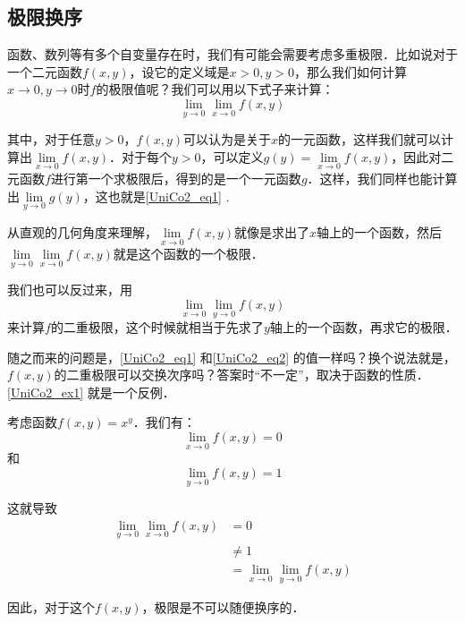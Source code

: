 

\subsection{极限换序}

函数、数列等有多个自变量存在时，我们有可能会需要考虑多重极限．比如说对于一个二元函数$f(x, y)$，设它的定义域是$x>0, y>0$，那么我们如何计算$x\to 0, y\to 0$时$f$的极限值呢？我们可以用以下式子来计算：
\begin{equation}\label{UniCo2_eq1}
\lim\limits_{y\to 0}\lim\limits_{x\to 0}f(x, y)
\end{equation}

其中，对于任意$y>0$，$f(x, y)$可以认为是关于$x$的一元函数，这样我们就可以计算出$\lim\limits_{x\to 0}f(x, y)$．对于每个$y>0$，可以定义$g(y)=\lim\limits_{x\to 0}f(x, y)$，因此对二元函数$f$进行第一个求极限后，得到的是一个一元函数$g$．这样，我们同样也能计算出$\lim\limits_{y\to 0}g(y)$，这也就是\autoref{UniCo2_eq1} .

从直观的几何角度来理解，$\lim\limits_{x\to 0}f(x, y)$就像是求出了$x$轴上的一个函数，然后$\lim\limits_{y\to 0}\lim\limits_{x\to 0}f(x, y)$就是这个函数的一个极限．

我们也可以反过来，用
\begin{equation}\label{UniCo2_eq2}
\lim\limits_{x\to 0}\lim\limits_{y\to 0}f(x, y)
\end{equation}
来计算$f$的二重极限，这个时候就相当于先求了$y$轴上的一个函数，再求它的极限．

随之而来的问题是，\autoref{UniCo2_eq1} 和\autoref{UniCo2_eq2} 的值一样吗？换个说法就是，$f(x, y)$的二重极限可以交换次序吗？答案时“不一定”，取决于函数的性质．\autoref{UniCo2_ex1} 就是一个反例．

\begin{example}{}\label{UniCo2_ex1}
考虑函数$f(x, y)=x^y$．我们有：
\begin{equation}
\lim\limits_{x\to 0}f(x, y)=0
\end{equation}
和
\begin{equation}
\lim\limits_{y\to 0}f(x, y)=1
\end{equation}

这就导致
\begin{equation}
\begin{aligned}
\lim\limits_{y\to 0}\lim\limits_{x\to 0}f(x, y)&=0\\
&\not = 1\\
&=\lim\limits_{x\to 0}\lim\limits_{y\to 0}f(x, y)
\end{aligned}
\end{equation}

因此，对于这个$f(x, y)$，极限是不可以随便换序的．

\end{example}



